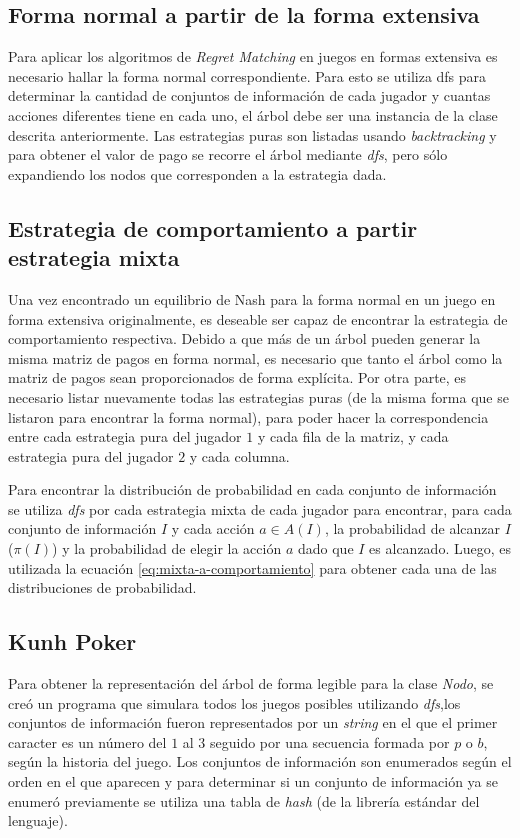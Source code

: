 \subsection{Forma normal a partir de la forma extensiva}
\label{subsec:FN-FE}

Para aplicar los algoritmos de \textit{Regret Matching} en juegos en formas extensiva es necesario hallar la forma normal correspondiente. Para esto se utiliza dfs para determinar la cantidad de conjuntos de información de cada jugador y cuantas acciones diferentes tiene en cada uno, el árbol debe ser una instancia de la clase descrita anteriormente. Las estrategias puras son listadas usando \textit{backtracking} y para obtener el valor de pago se recorre el árbol mediante \textit{dfs}, pero sólo expandiendo los nodos que corresponden a la estrategia dada.

\subsection{Estrategia de comportamiento a partir estrategia mixta}
\label{subsec:EC-EM}
Una vez encontrado un equilibrio de Nash para la forma normal en un juego en forma extensiva originalmente, es deseable ser capaz de encontrar la estrategia de comportamiento respectiva. Debido a que más de un árbol pueden generar la misma matriz de pagos en forma normal, es necesario que tanto el árbol como la matriz de pagos sean proporcionados de forma explícita. Por otra parte, es necesario listar nuevamente todas las estrategias puras (de la misma forma que se listaron para encontrar la forma normal), para poder hacer la correspondencia entre cada estrategia pura del jugador $1$ y cada fila de la matriz, y cada estrategia pura del jugador $2$ y cada columna.

Para encontrar la distribución de probabilidad en cada conjunto de información se utiliza \textit{dfs} por cada estrategia mixta de cada jugador para encontrar, para cada conjunto de información $I$ y cada acción $a \in A(I)$, la probabilidad de alcanzar $I$ ($\pi(I)$) y la probabilidad de elegir la acción $a$ dado que $I$ es alcanzado. Luego, es utilizada la ecuación \ref{eq:mixta-a-comportamiento} para obtener cada una de las distribuciones de probabilidad.

\subsection{Kunh Poker}
Para obtener la representación del árbol de forma legible para la clase \textit{Nodo}, se creó un programa que simulara todos los juegos posibles utilizando \textit{dfs},los conjuntos de información fueron representados por un \textit{string} en el que el primer caracter es un número del $1$ al $3$ seguido por una secuencia formada por $p$ o $b$, según la historia del juego. Los conjuntos de información son enumerados según el orden en el que aparecen y para determinar si un conjunto de información ya se enumeró previamente se utiliza una tabla de \textit{hash} (de la librería estándar del lenguaje).